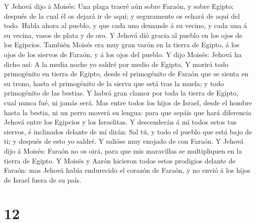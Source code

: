  Y Jehová dijo á Moisés: Una plaga traeré aún sobre
Faraón, y sobre Egipto; después de la cual él os dejará ir de aquí; y
seguramente os echará de aquí del todo.  Habla ahora al
pueblo, y que cada uno demande á su vecino, y cada una á su vecina,
vasos de plata y de oro.  Y Jehová dió gracia al pueblo en
los ojos de los Egipcios. También Moisés era muy gran varón en la tierra
de Egipto, á los ojos de los siervos de Faraón, y á los ojos del pueblo.
 Y dijo Moisés: Jehová ha dicho así: A la media noche yo
saldré por medio de Egipto,  Y morirá todo primogénito en
tierra de Egipto, desde el primogénito de Faraón que se sienta en su
trono, hasta el primogénito de la sierva que está tras la muela; y todo
primogénito de las bestias.  Y habrá gran clamor por toda
la tierra de Egipto, cual nunca fué, ni jamás será.  Mas
entre todos los hijos de Israel, desde el hombre hasta la bestia, ni un
perro moverá su lengua: para que sepáis que hará diferencia Jehová entre
los Egipcios y los Israelitas.  Y descenderán á mí todos
estos tus siervos, é inclinados delante de mí dirán: Sal tú, y todo el
pueblo que está bajo de ti; y después de esto yo saldré. Y salióse muy
enojado de con Faraón.  Y Jehová dijo á Moisés: Faraón no
os oirá, para que mis maravillas se multipliquen en la tierra de Egipto.
 Y Moisés y Aarón hicieron todos estos prodigios delante
de Faraón: mas Jehová había endurecido el corazón de Faraón, y no envió
á los hijos de Israel fuera de su país.

\hypertarget{section-11}{%
\section{12}\label{section-11}}

